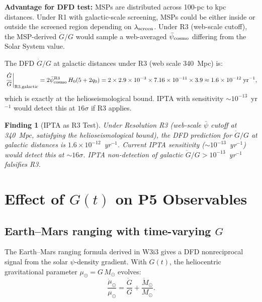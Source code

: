 \documentclass[aps,prd,twocolumn,superscriptaddress,nofootinbib,longbibliography]{revtex4-2}
\newcommand{\psibar}{\bar{\psi}}
\newcommand{\ee}[1]{\times 10^{#1}}
\newtheorem{finding}{Finding}
\begin{document}
\textbf{Advantage for DFD test:} MSPs are distributed across 100-pc to kpc
distances.  Under R1 with galactic-scale screening, MSPs could be either
inside or outside the screened region depending on $\lambda_{\rm screen}$.
Under R3 (web-scale cutoff), the MSP-derived $\dot{G}/G$ would sample
a web-averaged $\psibar_{\rm cosmo}$ differing from the Solar System value.

The DFD $\dot{G}/G$ at galactic distances under R3 (web scale 340~Mpc) is:
\begin{equation}
\left.\frac{\dot{G}}{G}\right|_{\rm R3, galactic}
= 2\psibar_{\rm cosmo}^{\rm R3}\,H_0(5+2q_0)
= 2\times 2.9\ee{-3}\times 7.16\ee{-11}\times 3.9
\approx 1.6\ee{-12}\;\text{yr}^{-1},
\label{eq:Gdot-R3-galactic}
\end{equation}
which is exactly at the helioseismological bound.  IPTA with sensitivity
$\sim 10^{-13}$~yr$^{-1}$ would detect this at $16\sigma$ if R3 applies.

\begin{finding}[IPTA as R3 Test]
Under Resolution R3 (web-scale $\psibar$ cutoff at 340~Mpc, satisfying the
helioseismological bound), the DFD prediction for $\dot{G}/G$ at galactic
distances is $1.6\ee{-12}$~yr$^{-1}$.  Current IPTA sensitivity
($\sim 10^{-13}$~yr$^{-1}$) would detect this at $\sim 16\sigma$.  IPTA
non-detection of galactic $\dot{G}/G > 10^{-13}$~yr$^{-1}$ falsifies R3.
\end{finding}

\section{Effect of $G(t)$ on P5 Observables}
\label{sec:P5-Gt-observables}

\subsection{Earth--Mars ranging with time-varying $G$}

The Earth--Mars ranging formula derived in W3i3 gives a DFD nonreciprocal
signal from the solar $\psi$-density gradient.  With $G(t)$, the
heliocentric gravitational parameter $\mu_\odot = G\,M_\odot$ evolves:
\begin{equation}
\frac{\dot{\mu}_\odot}{\mu_\odot} = \frac{\dot{G}}{G} + \frac{\dot{M}_\odot}{M_\odot}.
\label{eq:mu-dot}
\end{equation}
\end{document}
